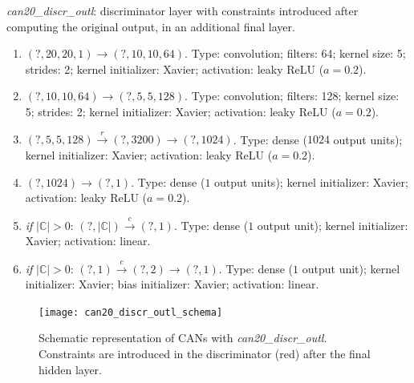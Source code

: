 \begin{description}
\item \textit{can20\_discr\_outl}: discriminator layer with constraints introduced after computing the original output, in an additional final layer.
\begin{enumerate}
    \item $(?, 20, 20, 1) \to (?, 10, 10, 64)$. Type: convolution; filters: 64; kernel size: 5; strides: 2; kernel initializer: Xavier; activation: leaky ReLU ($a = 0.2$).
    \item $(?, 10, 10, 64) \to (?, 5, 5, 128)$. Type: convolution; filters: 128; kernel size: 5; strides: 2; kernel initializer: Xavier; activation: leaky ReLU ($a = 0.2$).
    \item $(?, 5, 5, 128) \stackrel{r}{\to} (?, 3200) \to (?, 1024)$. Type: dense ($1024$ output units); kernel initializer: Xavier; activation: leaky ReLU ($a = 0.2$).
    \item $(?, 1024) \to (?, 1)$. Type: dense ($1$ output units); kernel initializer: Xavier; activation: leaky ReLU ($a = 0.2$).
    \item \textit{if} $|\mathbb{C}| > 0$: $(?, |\mathbb{C}|) \stackrel{c}{\to} (?, 1)$. Type: dense ($1$ output unit); kernel initializer: Xavier; activation: linear.
    \item \textit{if} $|\mathbb{C}| > 0$: $(?, 1) \stackrel{c}{\to} (?, 2) \to (?, 1)$. Type: dense ($1$ output unit); kernel initializer: Xavier; bias initializer: Xavier; activation: linear.
\end{enumerate}

\begin{figure}[ht]
    \centering
    \texttt{[image: can20\_discr\_outl\_schema]}
    \caption{Schematic representation of CANs with \textit{can20\_discr\_outl}. Constraints are introduced in the discriminator (red) after the final hidden layer.}
\end{figure}


\end{description}
